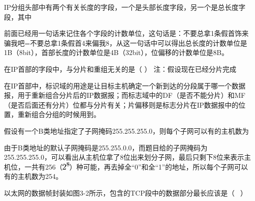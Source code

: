 \question IP分组头部中有两个有关长度的字段，一个是头部长度字段，另一个是总长度字段，其中
\par{}
\begin{solution}前面已经用一句话来记住各个字段的计数单位，这句话是：不要总拿1条假首饰来骗我吧=不要总拿1条假首4来偏我8，从这一句话中可以得出总长度的计数单位是1B（8bit），首部长度的计数单位是4B（32bit），位偏移的计数单位是8B。
\end{solution}
\question 在IP首部的字段中，与分片和重组无关的是（ ） 注：假设现在已经分片完成
\par{}
\begin{solution}在IP首部中，标识域的用途是让目标主机确定一个新到达的分段属于哪一个数据报，用于重新组合分片后的IP数据报；而标志域中的DF（是否不能分片）和MF（是否后面还有分片）位都与分片有关；片偏移则是标志分片在IP数据报中的位置，重新组合分组的时候用到。
\end{solution}
\question 假设有一个B类地址指定了子网掩码255.255.255.0，则每个子网可以有的主机数为
\par{}
\begin{solution}由于B类地址的默认子网掩码是255.255.0.0，而题目给的子网掩码为255.255.255.0，可以看出从主机位拿了8位出来划分子网，最后只剩下8位来表示主机位，一共有256（\includegraphics[width=0.14583in,height=0.15625in]{texmath/b618a75Cdpi7B3507D25E8}）种可能，再去掉全``0''和全``1''的地址，所以每个子网可以有的主机数为254。
\end{solution}
\question 以太网的数据帧封装如图3-2所示，包含的TCP段中的数据部分最长应该是（ ~）

